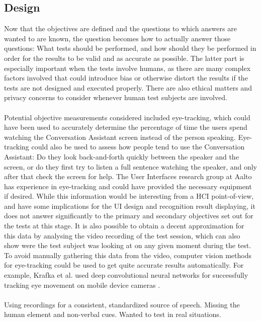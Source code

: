 \documentclass[english, 12pt, a4paper, pdftex, elec, utf8]{aaltothesis}
\begin{document}
\subsection{Design}

Now that the objectives are defined and the questions to which answers are wanted to are known, the question becomes how to actually answer those questions: What tests should be performed, and how should they be performed in order for the results to be valid and as accurate as possible. The latter part is especially important when the tests involve humans, as there are many complex factors involved that could introduce bias or otherwise distort the results if the tests are not designed and executed properly. There are also ethical matters and privacy concerns to consider whenever human test subjects are involved. \cite{rubin2008handbook} \\\\
Potential objective measurements considered included eye-tracking, which could have been used to accurately determine the percentage of time the users spend watching the Conversation Assistant screen instead of the person speaking. Eye-tracking could also be used to assess how people tend to use the Conversation Assistant: Do they look back-and-forth quickly between the speaker and the screen, or do they first try to listen a full sentence watching the speaker, and only after that check the screen for help. The User Interfaces research group at Aalto has experience in eye-tracking and could have provided the necessary equipment if desired. While this information would be interesting from a HCI point-of-view, and have some implications for the UI design and recognition result displaying, it does not answer significantly to the primary and secondary objectives set out for the tests at this stage. It is also possible to obtain a decent approximation for this data by analysing the video recording of the test session, which can also show were the test subject was looking at on any given moment during the test. To avoid manually gathering this data from the video, computer vision methods for eye-tracking could be used to get quite accurate results automatically. For example, Krafka et al. used deep convolutional neural networks for successfully tracking eye movement on mobile device cameras \cite{krafka2016eye}. \\\\  
Using recordings for a consistent, standardized source of speech. Missing the human element and non-verbal cues. Wanted to test in real situations.
\end{document}

